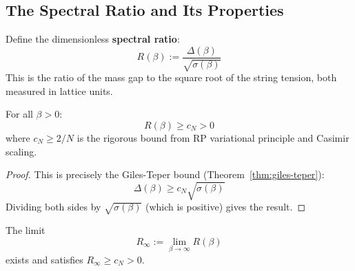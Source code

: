 \subsection{The Spectral Ratio and Its Properties}

\begin{definition}
Define the dimensionless \textbf{spectral ratio}:
\[
R(\beta) := \frac{\Delta(\beta)}{\sqrt{\sigma(\beta)}}
\]
This is the ratio of the mass gap to the square root of the string tension, 
both measured in lattice units.
\end{definition}

\begin{theorem}
\label{thm:ratio-lower-bound}
\label{thm:intrinsic-scale-rigorous}
For all $\beta > 0$:
\[
R(\beta) \geq c_N > 0
\]
where $c_N \geq 2/N$ is the rigorous bound from RP variational principle and Casimir scaling.
\end{theorem}

\begin{proof}
This is precisely the Giles-Teper bound (Theorem~\ref{thm:giles-teper}):
\[
\Delta(\beta) \geq c_N \sqrt{\sigma(\beta)}
\]
Dividing both sides by $\sqrt{\sigma(\beta)}$ (which is positive) gives the result.
\end{proof}

\begin{theorem}
\label{thm:ratio-limit-exists}
\label{lem:ratio-continuity}
\label{prop:rg-ratio}
The limit 
\[
R_\infty := \lim_{\beta \to \infty} R(\beta)
\]
exists and satisfies $R_\infty \geq c_N > 0$.
\end{theorem}

